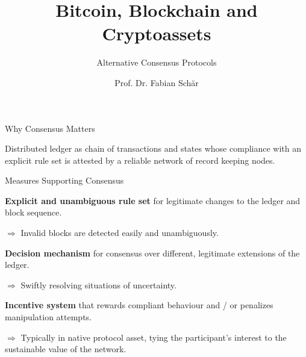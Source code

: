 \documentclass[]{beamer}
\title{Bitcoin, Blockchain and Cryptoassets}
\subtitle{Alternative Consensus Protocols}
\author{Prof. Dr. Fabian Schär}
\institute{University of Basel}
\begin{document}
	
	\thispagestyle{empty}
	\begin{frame}[noframenumbering]
		\titlepage
	\end{frame}
	
	
	\begin{frame}{Why Consensus Matters}
		
		Distributed ledger as \color{focus} chain of transactions and states \color{black} whose \color{focus} compliance with an explicit rule set \color{black} is  attested by a reliable network of record keeping nodes.
		
		
	\end{frame}
	
	\begin{frame}{Measures Supporting Consensus}
		
		\textbf{Explicit and unambiguous rule set} for legitimate changes to the ledger and block sequence.
		\vspace{0.25 em}
		
		$\Rightarrow$ Invalid blocks are detected easily and unambiguously.
		\vspace{1.5 em}
		
		\textbf{Decision mechanism} for consensus over different, legitimate extensions of the ledger. 
		\vspace{0.25 em}
		
		$\Rightarrow$ Swiftly resolving situations of uncertainty.
		\vspace{1.5 em}
		
		\textbf{Incentive system} that rewards compliant behaviour and / or penalizes manipulation attempts.
		\vspace{0.25 em}
		
		$\Rightarrow$ Typically in native protocol asset, tying the participant's interest to the sustainable value of the network.
		
	\end{frame}
	
\end{document}
